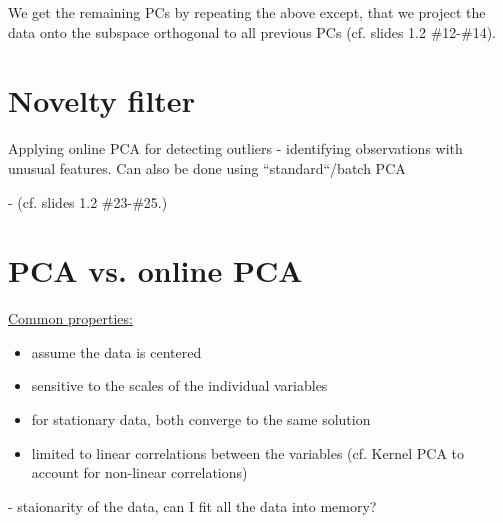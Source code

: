 \begin{frame}

We get the remaining PCs by repeating the above except, that we project 
the data onto the subspace orthogonal to all previous PCs (cf. slides 1.2 \#12-\#14).

\end{frame}

\newpage

\section{Novelty filter}

Applying online PCA for detecting outliers - identifying observations with unusual features. 
Can also be done using ``standard``/batch PCA




- (cf. slides 1.2 \#23-\#25.)

\section{PCA vs. online PCA}

\underline{Common properties:}

\begin{itemize}
\item assume the data is centered
\item sensitive to the scales of the individual variables
\item for stationary data, both converge to the same solution
\item limited to linear correlations between the variables (cf. Kernel PCA to account for non-linear correlations)
\end{itemize}


- staionarity of the data, can I fit all the data into memory?
